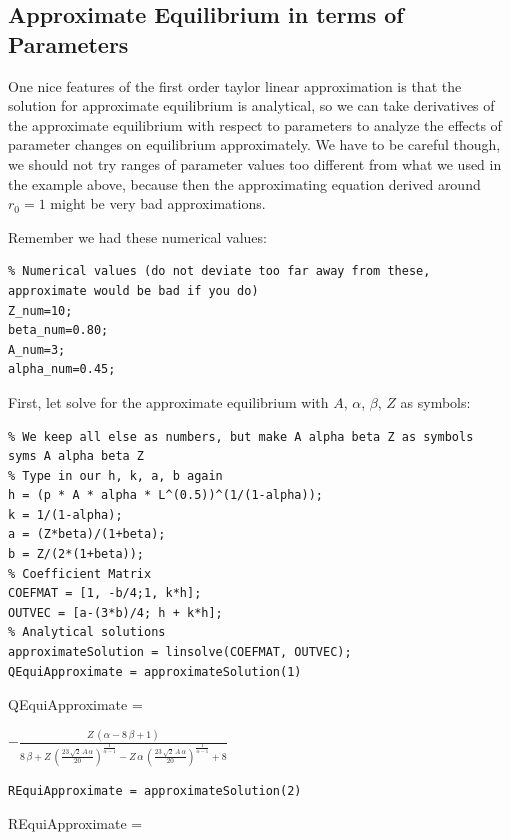 \documentclass[
]{book}
\begin{document}
\hypertarget{approximate-equilibrium-in-terms-of-parameters}{%
\subsection{Approximate Equilibrium in terms of Parameters}\label{approximate-equilibrium-in-terms-of-parameters}}

One nice features of the first order taylor linear approximation is that
the solution for approximate equilibrium is analytical, so we can take
derivatives of the approximate equilibrium with respect to parameters to
analyze the effects of parameter changes on equilibrium approximately.
We have to be careful though, we should not try ranges of parameter
values too different from what we used in the example above, because
then the approximating equation derived around \(r_0 =1\) might be very
bad approximations.

Remember we had these numerical values:

\begin{verbatim}
% Numerical values (do not deviate too far away from these, approximate would be bad if you do)
Z_num=10;
beta_num=0.80;
A_num=3; 
alpha_num=0.45;
\end{verbatim}

First, let solve for the approximate equilibrium with \(A\), \(\alpha\),
\(\beta\), \(Z\) as symbols:

\begin{verbatim}
% We keep all else as numbers, but make A alpha beta Z as symbols
syms A alpha beta Z
% Type in our h, k, a, b again
h = (p * A * alpha * L^(0.5))^(1/(1-alpha));
k = 1/(1-alpha);
a = (Z*beta)/(1+beta);
b = Z/(2*(1+beta));
% Coefficient Matrix
COEFMAT = [1, -b/4;1, k*h];
OUTVEC = [a-(3*b)/4; h + k*h];
% Analytical solutions
approximateSolution = linsolve(COEFMAT, OUTVEC);
QEquiApproximate = approximateSolution(1)
\end{verbatim}

QEquiApproximate =

\(\displaystyle -\frac{Z\,{\left(\alpha -8\,\beta +1\right)}}{8\,\beta +Z\,{{\left(\frac{23\,\sqrt{2}\,A\,\alpha }{20}\right)}}^{\frac{1}{\alpha -1}} -Z\,\alpha \,{{\left(\frac{23\,\sqrt{2}\,A\,\alpha }{20}\right)}}^{\frac{1}{\alpha -1}} +8}\)

\begin{verbatim}
REquiApproximate = approximateSolution(2)
\end{verbatim}

REquiApproximate =
\end{document}
